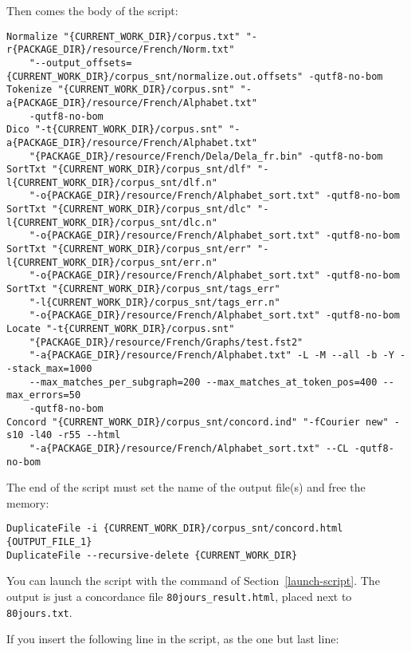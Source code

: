 \noindent Then comes the body of the script:

\begin{Verbatim}[fontsize=\small,fontfamily=helvetica]
Normalize "{CURRENT_WORK_DIR}/corpus.txt" "-r{PACKAGE_DIR}/resource/French/Norm.txt" 
    "--output_offsets={CURRENT_WORK_DIR}/corpus_snt/normalize.out.offsets" -qutf8-no-bom
Tokenize "{CURRENT_WORK_DIR}/corpus.snt" "-a{PACKAGE_DIR}/resource/French/Alphabet.txt"
    -qutf8-no-bom
Dico "-t{CURRENT_WORK_DIR}/corpus.snt" "-a{PACKAGE_DIR}/resource/French/Alphabet.txt" 
    "{PACKAGE_DIR}/resource/French/Dela/Dela_fr.bin" -qutf8-no-bom
SortTxt "{CURRENT_WORK_DIR}/corpus_snt/dlf" "-l{CURRENT_WORK_DIR}/corpus_snt/dlf.n" 
    "-o{PACKAGE_DIR}/resource/French/Alphabet_sort.txt" -qutf8-no-bom
SortTxt "{CURRENT_WORK_DIR}/corpus_snt/dlc" "-l{CURRENT_WORK_DIR}/corpus_snt/dlc.n" 
    "-o{PACKAGE_DIR}/resource/French/Alphabet_sort.txt" -qutf8-no-bom
SortTxt "{CURRENT_WORK_DIR}/corpus_snt/err" "-l{CURRENT_WORK_DIR}/corpus_snt/err.n" 
    "-o{PACKAGE_DIR}/resource/French/Alphabet_sort.txt" -qutf8-no-bom
SortTxt "{CURRENT_WORK_DIR}/corpus_snt/tags_err"
    "-l{CURRENT_WORK_DIR}/corpus_snt/tags_err.n" 
    "-o{PACKAGE_DIR}/resource/French/Alphabet_sort.txt" -qutf8-no-bom
Locate "-t{CURRENT_WORK_DIR}/corpus.snt"
    "{PACKAGE_DIR}/resource/French/Graphs/test.fst2" 
    "-a{PACKAGE_DIR}/resource/French/Alphabet.txt" -L -M --all -b -Y --stack_max=1000
    --max_matches_per_subgraph=200 --max_matches_at_token_pos=400 --max_errors=50
    -qutf8-no-bom
Concord "{CURRENT_WORK_DIR}/corpus_snt/concord.ind" "-fCourier new" -s10 -l40 -r55 --html 
    "-a{PACKAGE_DIR}/resource/French/Alphabet_sort.txt" --CL -qutf8-no-bom
\end{Verbatim}

\noindent The end of the script must set the name of the output file(s) and free the memory:

\begin{Verbatim}[fontsize=\small,fontfamily=helvetica]
DuplicateFile -i {CURRENT_WORK_DIR}/corpus_snt/concord.html {OUTPUT_FILE_1}
DuplicateFile --recursive-delete {CURRENT_WORK_DIR}
\end{Verbatim}

\noindent You can launch the script with the command of Section~\ref{launch-script}. The output
is just a concordance file \verb$80jours_result.html$, placed next to \verb$80jours.txt$.

\bigskip
\noindent If you insert the following line in the script, as the one but last line:

